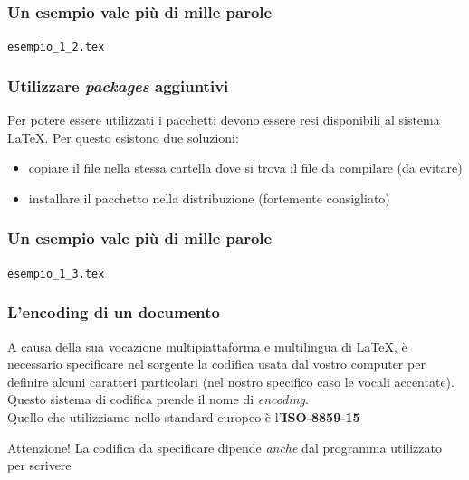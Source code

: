 \documentclass[svgnames,%
	ucs,%
	pdftex]{guitbeamer}
\begin{document}
\begin{frame}
  \frametitle{Un esempio vale pi\`u di mille parole}
	\begin{center}
		\alert{\texttt{esempio\_1\_2.tex}}
	\end{center}
\end{frame}
\begin{frame}
  \frametitle{Utilizzare \textit{packages} aggiuntivi}
	Per potere essere utilizzati i pacchetti devono essere resi
	disponibili al sistema \LaTeX. Per questo esistono due soluzioni:
	\begin{itemize}
		\item copiare il file  nella stessa cartella dove si trova il file  da compilare (da evitare)
		\item installare il pacchetto nella distribuzione (fortemente consigliato)
	\end{itemize}
\end{frame}
\begin{frame}
  \frametitle{Un esempio vale pi\`u di mille parole}
	\begin{center}
		\alert{\texttt{esempio\_1\_3.tex}}
	\end{center}
\end{frame}
\begin{frame}
  \frametitle{L'encoding di un documento}
	A causa della sua vocazione multipiattaforma e multilingua di \LaTeX, \`e necessario specificare nel sorgente la codifica usata dal vostro computer per definire alcuni caratteri particolari (nel nostro specifico caso le vocali accentate). Questo sistema di codifica prende il nome di \emph{encoding}.\\
  \smallskip
	Quello che utilizziamo nello standard europeo \`e l'\textbf{ISO-8859-15}
	\begin{block}{Attenzione!}
		La codifica da specificare dipende \emph{anche} dal programma utilizzato per scrivere
	\end{block}
\end{frame}
\end{document}
